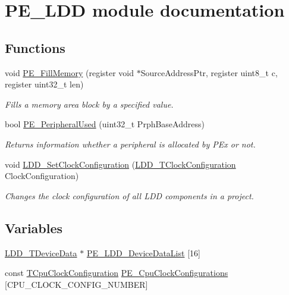 \hypertarget{group___p_e___l_d_d__module}{\section{P\-E\-\_\-\-L\-D\-D module documentation}
\label{group___p_e___l_d_d__module}
}
\subsection*{Functions}
\begin{DoxyCompactItemize}
\item 
void \hyperlink{group___p_e___l_d_d__module_ga6cb22864b71fd00f200c9fb3375f4e29}{P\-E\-\_\-\-Fill\-Memory} (register void $\ast$Source\-Address\-Ptr, register uint8\-\_\-t c, register uint32\-\_\-t len)
\begin{DoxyCompactList}\small\item\em Fills a memory area block by a specified value. \end{DoxyCompactList}\item 
bool \hyperlink{group___p_e___l_d_d__module_ga9e049b01a45212fe5b6a8476fe124b59}{P\-E\-\_\-\-Peripheral\-Used} (uint32\-\_\-t Prph\-Base\-Address)
\begin{DoxyCompactList}\small\item\em Returns information whether a peripheral is allocated by P\-Ex or not. \end{DoxyCompactList}\item 
void \hyperlink{group___p_e___l_d_d__module_ga7fe8a131453ba765c5e85130a282eafb}{L\-D\-D\-\_\-\-Set\-Clock\-Configuration} (\hyperlink{group___p_e___types__module_ga369bcaf7f00caad5f994c72ac2629a37}{L\-D\-D\-\_\-\-T\-Clock\-Configuration} Clock\-Configuration)
\begin{DoxyCompactList}\small\item\em Changes the clock configuration of all L\-D\-D components in a project. \end{DoxyCompactList}\end{DoxyCompactItemize}
\subsection*{Variables}
\begin{DoxyCompactItemize}
\item 
\hyperlink{group___p_e___types__module_gac5cf1362f1f0e3a2ce71b1bf2276d091}{L\-D\-D\-\_\-\-T\-Device\-Data} $\ast$ \hyperlink{group___p_e___l_d_d__module_ga0e190ffd5b611678884f6e3d99a9d0ac}{P\-E\-\_\-\-L\-D\-D\-\_\-\-Device\-Data\-List} \mbox{[}16\mbox{]}
\item 
const \hyperlink{struct_t_cpu_clock_configuration}{T\-Cpu\-Clock\-Configuration} \hyperlink{group___p_e___l_d_d__module_gab69281f0e90d16198a5595ed7f471441}{P\-E\-\_\-\-Cpu\-Clock\-Configurations} \mbox{[}C\-P\-U\-\_\-\-C\-L\-O\-C\-K\-\_\-\-C\-O\-N\-F\-I\-G\-\_\-\-N\-U\-M\-B\-E\-R\mbox{]}
\end{DoxyCompactItemize}


